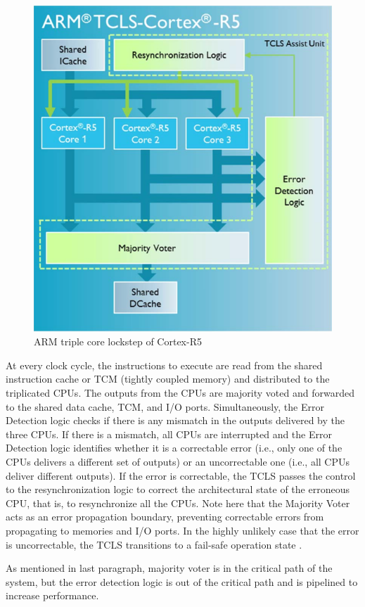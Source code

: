 \begin{figure}[H]

      \centering
      \includegraphics[width=0.7\linewidth]{images/tcls_architecture.png}
      \caption{ARM triple core lockstep of Cortex-R5 \citep{TCLS_cortex_r}}
      \label{fig:tcls_architecture}
    
\end{figure}

At every clock cycle, the instructions to execute are read
from the shared instruction cache or TCM (tightly coupled memory) and distributed to
the triplicated CPUs. The outputs from the CPUs are majority voted and
forwarded to the shared data cache, TCM, and I/O ports.
Simultaneously, the Error Detection logic checks if there is any
mismatch in the outputs delivered by the three CPUs. If there is
a mismatch, all CPUs are interrupted and the Error Detection
logic identifies whether it is a correctable error (i.e., only one
of the CPUs delivers a different set of outputs) or an
uncorrectable one (i.e., all CPUs deliver different outputs). If
the error is correctable, the TCLS passes the control to the
resynchronization logic to correct the architectural state of the
erroneous CPU, that is, to resynchronize all the CPUs. Note
here that the Majority Voter acts as an error propagation
boundary, preventing correctable errors from propagating to
memories and I/O ports. In the highly unlikely case that the
error is uncorrectable, the TCLS transitions to a fail-safe
operation state \citep{TCLS_cortex_r}.

As mentioned in last paragraph, majority voter is in the critical path of the system, but the error detection logic is  out of the critical path and is pipelined to increase performance.

